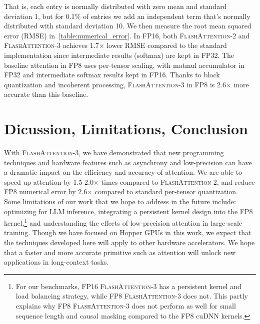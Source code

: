 That is, each entry is normally distributed with zero mean and standard deviation 1, but for 0.1\% of entries we add an independent term that's normally distributed with standard deviation 10. We then measure the root mean squared error (RMSE) in~\cref{table:numerical_error}.
In FP16, both \textsc{FlashAttention-2} and \textsc{FlashAttention-3} achieves 1.7$\times$ lower RMSE compared to the standard implementation since intermediate results (softmax) are kept in FP32. The baseline attention in FP8 uses per-tensor scaling, with matmul accumulator in FP32 and intermediate softmax results kept in FP16. Thanks to block quantization and incoherent processing, \textsc{FlashAttention-3} in FP8 is 2.6$\times$ more accurate than this baseline.

\section{Dicussion, Limitations, Conclusion}
\label{sec:discussion}

With \textsc{FlashAttention-3}, we have demonstrated that new programming techniques and hardware features such as asynchrony and low-precision can have a dramatic impact on the efficiency and accuracy of attention. We are able to speed up attention by 1.5-2.0$\times$ times compared to \textsc{FlashAttention-2}, and reduce FP8 numerical error by 2.6$\times$ compared to standard per-tensor quantization. Some limitations of our work that we hope to address in the future include: optimizing for LLM inference, integrating a persistent kernel design into the FP8 kernel,\footnote{For our benchmarks, FP16 \textsc{FlashAttention-3} has a persistent kernel and load balancing strategy, while FP8 \textsc{FlashAttention-3} does not. This partly explains why FP8 \textsc{FlashAttention-3} does not perform as well for small sequence length and causal masking compared to the FP8 cuDNN kernels.} and understanding the effects of low-precision attention in large-scale training. Though we have focused on Hopper GPUs in this work, we expect that the techniques developed here will apply to other hardware accelerators. We hope that a faster and more accurate primitive such as attention will unlock new applications in long-context tasks.

